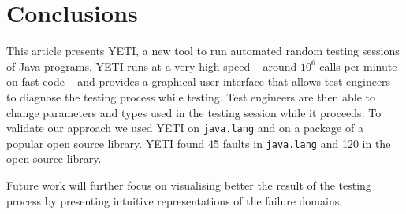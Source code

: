 \section{Conclusions}\label{sec:conc}
This article presents YETI, a new tool to run automated random testing 
sessions of Java programs. YETI runs at a very high speed -- around $10^{6}$ calls per 
minute on fast code -- and provides a graphical user interface that allows test engineers to
diagnose the testing process while testing. Test engineers are then able to 
change parameters and types used in the testing session while it proceeds.
To validate our approach we used YETI on \texttt{java.lang} and on a package
of a popular open source library. YETI found 45 faults in 
\texttt{java.lang} and 120 in the open source library.

Future work will further focus on visualising better the result of the testing process 
by presenting intuitive representations of the failure domains.